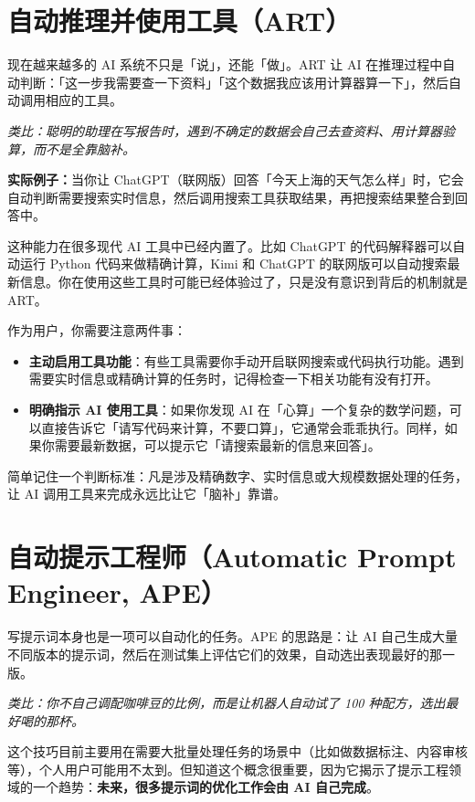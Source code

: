 \section{自动推理并使用工具（ART）}

现在越来越多的 AI 系统不只是「说」，还能「做」。ART 让 AI 在推理过程中自动判断：「这一步我需要查一下资料」「这个数据我应该用计算器算一下」，然后自动调用相应的工具。

\textit{类比：聪明的助理在写报告时，遇到不确定的数据会自己去查资料、用计算器验算，而不是全靠脑补。}

\textbf{实际例子：}当你让 ChatGPT（联网版）回答「今天上海的天气怎么样」时，它会自动判断需要搜索实时信息，然后调用搜索工具获取结果，再把搜索结果整合到回答中。

这种能力在很多现代 AI 工具中已经内置了。比如 ChatGPT 的代码解释器可以自动运行 Python 代码来做精确计算，Kimi 和 ChatGPT 的联网版可以自动搜索最新信息。你在使用这些工具时可能已经体验过了，只是没有意识到背后的机制就是 ART。

作为用户，你需要注意两件事：

\begin{itemize}
  \item \textbf{主动启用工具功能}：有些工具需要你手动开启联网搜索或代码执行功能。遇到需要实时信息或精确计算的任务时，记得检查一下相关功能有没有打开。
  \item \textbf{明确指示 AI 使用工具}：如果你发现 AI 在「心算」一个复杂的数学问题，可以直接告诉它「请写代码来计算，不要口算」，它通常会乖乖执行。同样，如果你需要最新数据，可以提示它「请搜索最新的信息来回答」。
\end{itemize}

简单记住一个判断标准：凡是涉及精确数字、实时信息或大规模数据处理的任务，让 AI 调用工具来完成永远比让它「脑补」靠谱。

\section{自动提示工程师（Automatic Prompt Engineer, APE）}

写提示词本身也是一项可以自动化的任务。APE 的思路是：让 AI 自己生成大量不同版本的提示词，然后在测试集上评估它们的效果，自动选出表现最好的那一版。

\textit{类比：你不自己调配咖啡豆的比例，而是让机器人自动试了 100 种配方，选出最好喝的那杯。}

这个技巧目前主要用在需要大批量处理任务的场景中（比如做数据标注、内容审核等），个人用户可能用不太到。但知道这个概念很重要，因为它揭示了提示工程领域的一个趋势：\textbf{未来，很多提示词的优化工作会由 AI 自己完成}。

